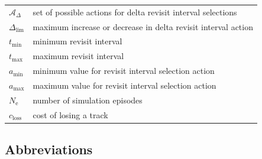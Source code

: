 \documentclass[english, 12pt, a4paper, elec, utf8, a-1b, online]{aaltothesis}
\numberwithin{equation}{section}
\newcommand{\amax}{a_\text{max}}
\newcommand{\amin}{a_\text{min}}
\newcommand{\Ne}{N_\text{e}}
\newcommand{\As}{\mathcal{A}}
\newcommand{\tmax}{t_\text{max}}
\newcommand{\tmin}{t_\text{min}}
\newcommand{\deltalim}{\Delta_\text{lim}}
\newcommand{\Asdelta}{\As_\Delta}
\newcommand{\closs}{c_\text{loss}}
\begin{document}
\begin{longtable}{ll}
$\Asdelta$ & set of possible actions for delta revisit interval selections \\
$\deltalim$ & maximum increase or decrease in delta revisit interval action \\
$\tmin$ & minimum revisit interval \\
$\tmax$ & maximum revisit interval \\
$\amin$ & minimum value for revisit interval selection action \\
$\amax$ & maximum value for revisit interval selection action \\
$\Ne$ & number of simulation episodes \\
$\closs$ & cost of losing a track \\
\end{longtable}

\subsection*{Abbreviations}
\end{document}
